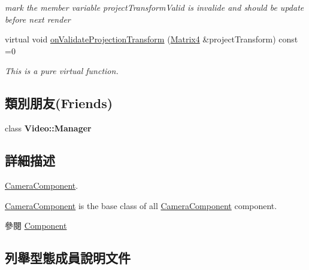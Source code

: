 \begin{DoxyCompactItemize}
\begin{DoxyCompactList}\small\item\em mark the member variable project\+Transform\+Valid is invalide and should be update before next render \end{DoxyCompactList}\item 
virtual void \hyperlink{class_magnum_1_1_camera_component_a54bc2d46cd53d0bf4c7151ecc25d37d1}{on\+Validate\+Projection\+Transform} (\hyperlink{class_magnum_1_1_matrix4}{Matrix4} \&project\+Transform) const  =0
\begin{DoxyCompactList}\small\item\em This is a pure virtual function. \end{DoxyCompactList}\end{DoxyCompactItemize}
\subsection*{類別朋友(Friends)}
\begin{DoxyCompactItemize}
\item 
class {\bfseries Video\+::\+Manager}\hypertarget{class_magnum_1_1_camera_component_a96cc6acb288ad905825c71c3a22a9c9f}{}\label{class_magnum_1_1_camera_component_a96cc6acb288ad905825c71c3a22a9c9f}

\end{DoxyCompactItemize}


\subsection{詳細描述}
\hyperlink{class_magnum_1_1_camera_component}{Camera\+Component}. 

\hyperlink{class_magnum_1_1_camera_component}{Camera\+Component} is the base class of all \hyperlink{class_magnum_1_1_camera_component}{Camera\+Component} component. \begin{DoxySeeAlso}{參閱}
\hyperlink{class_magnum_1_1_component}{Component} 
\end{DoxySeeAlso}


\subsection{列舉型態成員說明文件}
